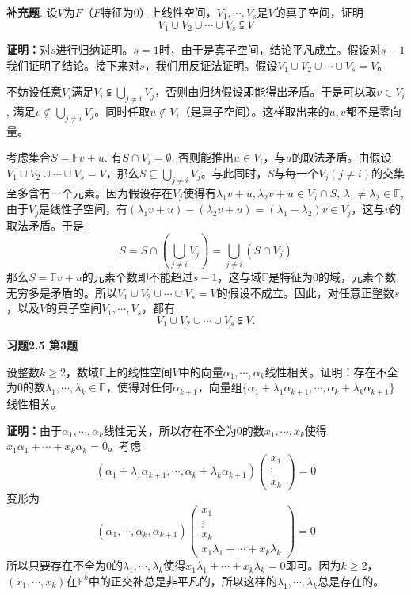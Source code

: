 \newpageorvspace

{\bf 补充题}. 设$V$为$F$（$F$特征为0）上线性空间，$V_1,\cdots,V_s$是$V$的真子空间，证明
$$V_1\cup V_2\cup \cdots \cup V_s \subsetneqq V$$

{\bf 证明：}对$s$进行归纳证明。$s=1$时，由于是真子空间，结论平凡成立。假设对$s-1$我们证明了结论。接下来对$s$，我们用反证法证明。假设$V_1\cup V_2\cup \cdots \cup V_s = V$。

不妨设任意$V_i$满足$V_i \subsetneqq \bigcup\limits_{j\neq i} V_j$，否则由归纳假设即能得出矛盾。于是可以取$v\in V_i$, 满足$v\not\in \bigcup\limits_{j\neq i} V_j$。同时任取$u\not\in V_i$（是真子空间）。这样取出来的$u,v$都不是零向量。

考虑集合$S = \mathbb{F}v + u$. 有$S\cap V_i=\emptyset$, 否则能推出$u\in V_i$，与$u$的取法矛盾。由假设$V_1\cup V_2\cup \cdots \cup V_s = V$，那么$S\subseteq \bigcup\limits_{j\neq i} V_j$。与此同时，$S$与每一个$V_j (j\neq i)$的交集至多含有一个元素。因为假设存在$V_j$使得有$\lambda_1v+u, \lambda_2v+u \in V_j\cap S$, $\lambda_1\neq\lambda_2 \in \mathbb{F}$, 由于$V_j$是线性子空间，有$(\lambda_1v+u) - (\lambda_2v+u) = (\lambda_1 - \lambda_2)v \in V_j$，这与$v$的取法矛盾。于是
$$S = S\cap (\bigcup\limits_{j\neq i} V_j) = \bigcup\limits_{j\neq i} (S \cap V_j)$$
那么$S = \mathbb{F}v + u$的元素个数即不能超过$s-1$，这与域$\mathbb{F}$是特征为0的域，元素个数无穷多是矛盾的。所以$V_1\cup V_2\cup \cdots \cup V_s = V$的假设不成立。因此，对任意正整数$s$，以及$V$的真子空间$V_1,\cdots,V_s$，都有
$$V_1\cup V_2\cup \cdots \cup V_s \subsetneqq V.$$

\newpageorvspace

{\bf 习题2.5 第3题}

设整数$k\geqslant 2$，数域$\mathbb{F}$上的线性空间$V$中的向量$\alpha_1,\cdots, \alpha_k$线性相关。证明：存在不全为0的数$\lambda_1,\cdots,\lambda_k\in \mathbb{F}$，使得对任何$\alpha_{k+1}$，向量组$\{\alpha_1+\lambda_1\alpha_{k+1}, \cdots, \alpha_k+\lambda_k\alpha_{k+1}\}$线性相关。

{\bf 证明：}由于$\alpha_1,\cdots, \alpha_k$线性无关，所以存在不全为0的数$x_1,\cdots,x_k$使得$x_1\alpha_1+\cdots+x_k\alpha_k = 0$。考虑
$$(\alpha_1+\lambda_1\alpha_{k+1}, \cdots, \alpha_k+\lambda_k\alpha_{k+1}) \begin{pmatrix} x_1 \\ \vdots \\ x_k \end{pmatrix} = 0$$
变形为
$$(\alpha_1, \cdots, \alpha_k, \alpha_{k+1}) \begin{pmatrix} x_1 \\ \vdots \\ x_k \\ x_1\lambda_1+\cdots+x_k\lambda_k \end{pmatrix} = 0$$
所以只要存在不全为0的$\lambda_1,\cdots,\lambda_k$使得$x_1\lambda_1+\cdots+x_k\lambda_k=0$即可。因为$k\geqslant 2$，$(x_1,\cdots,x_k)$在$\mathbb{F}^k$中的正交补总是非平凡的，所以这样的$\lambda_1,\cdots,\lambda_k$总是存在的。


